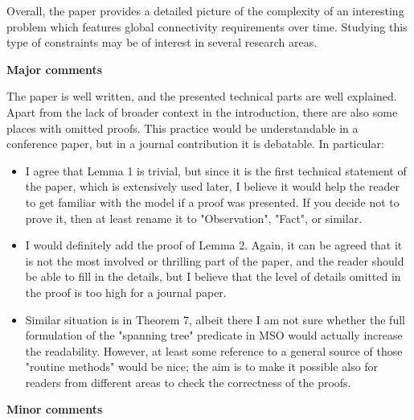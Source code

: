 \documentclass[11pt,a4paper]{article}
\begin{document}
Overall, the paper provides a detailed picture of the complexity of an
interesting problem which features global connectivity requirements over time.
Studying this type of constraints may be of interest in several research
areas.

\textbf{Major comments}

The paper is well written, and the presented technical parts are well
explained.  Apart from the lack of broader context in the introduction, there
are also some places with omitted proofs. This practice would be understandable
in a conference paper, but in a journal contribution it is debatable. In
particular:

\begin{itemize}

\item I agree that Lemma 1 is trivial, but since it is the first technical
  statement of the paper, which is extensively used later, I believe it would
  help the reader to get familiar with the model if a proof was presented. If
  you decide not to prove it, then at least rename it to "Observation", "Fact",
  or similar.

\item I would definitely add the proof of Lemma 2. Again, it can be agreed that it
  is not the most involved or thrilling part of the paper, and the reader
  should be able to fill in the details, but I believe that the level of
  details omitted in the proof is too high for a journal paper.

\item Similar situation is in Theorem 7, albeit there I am not sure whether the
  full formulation of the "spanning tree" predicate in MSO would actually
  increase the readability. However, at least some reference to a general
  source of those "routine methods" would be nice; the aim is to make it
  possible also for readers from different areas to check the correctness of
  the proofs.
 
\end{itemize}

\textbf{Minor comments}
\end{document}
